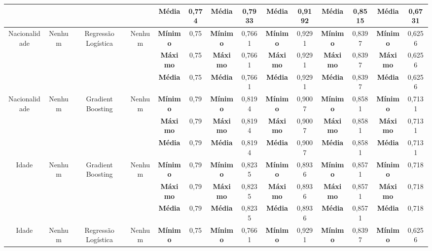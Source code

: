 \documentclass[portugues]{ic-tese}
\begin{document}
\begin{table}[H]
\begin{center}
{\begin{tabular}{c|c|c|c|c|c|c|c|c|c|c|c|c|c}
             & & & & \textbf{Média} & 0,774 & \textbf{Média} & 0,7933 & \textbf{Média} & 0,9192 & \textbf{Média} & 0,8515 & \textbf{Média} & 0,6731 \\
            \hline
            \multirow{3}{*}{Nacionalidade} & \multirow{3}{*}{Nenhum} & \multirow{3}{*}{Regressão Logística} & \multirow{3}{*}{Nenhum} & \textbf{Mínimo} & 0,75 & \textbf{Mínimo} & 0,7661 & \textbf{Mínimo} & 0,9291 & \textbf{Mínimo} & 0,8397 & \textbf{Mínimo} & 0,6256 \\
             & & & & \textbf{Máximo} & 0,75 & \textbf{Máximo} & 0,7661 & \textbf{Máximo} & 0,9291 & \textbf{Máximo} & 0,8397 & \textbf{Máximo} & 0,6256 \\
             & & & & \textbf{Média} & 0,75 & \textbf{Média} & 0,7661 & \textbf{Média} & 0,9291 & \textbf{Média} & 0,8397 & \textbf{Média} & 0,6256 \\
            \hline
            \multirow{3}{*}{Nacionalidade} & \multirow{3}{*}{Nenhum} & \multirow{3}{*}{Gradient Boosting} & \multirow{3}{*}{Nenhum} & \textbf{Mínimo} & 0,79 & \textbf{Mínimo} & 0,8194 & \textbf{Mínimo} & 0,9007 & \textbf{Mínimo} & 0,8581 & \textbf{Mínimo} & 0,7131 \\
             & & & & \textbf{Máximo} & 0,79 & \textbf{Máximo} & 0,8194 & \textbf{Máximo} & 0,9007 & \textbf{Máximo} & 0,8581 & \textbf{Máximo} & 0,7131 \\
             & & & & \textbf{Média} & 0,79 & \textbf{Média} & 0,8194 & \textbf{Média} & 0,9007 & \textbf{Média} & 0,8581 & \textbf{Média} & 0,7131 \\
            \hline
            \multirow{3}{*}{Idade} & \multirow{3}{*}{Nenhum} & \multirow{3}{*}{Gradient Boosting} & \multirow{3}{*}{Nenhum} & \textbf{Mínimo} & 0,79 & \textbf{Mínimo} & 0,8235 & \textbf{Mínimo} & 0,8936 & \textbf{Mínimo} & 0,8571 & \textbf{Mínimo} & 0,718 \\
             & & & & \textbf{Máximo} & 0,79 & \textbf{Máximo} & 0,8235 & \textbf{Máximo} & 0,8936 & \textbf{Máximo} & 0,8571 & \textbf{Máximo} & 0,718 \\
             & & & & \textbf{Média} & 0,79 & \textbf{Média} & 0,8235 & \textbf{Média} & 0,8936 & \textbf{Média} & 0,8571 & \textbf{Média} & 0,718 \\
            \hline
            \multirow{3}{*}{Idade} & \multirow{3}{*}{Nenhum} & \multirow{3}{*}{Regressão Logística} & \multirow{3}{*}{Nenhum} & \textbf{Mínimo} & 0,75 & \textbf{Mínimo} & 0,7661 & \textbf{Mínimo} & 0,9291 & \textbf{Mínimo} & 0,8397 & \textbf{Mínimo} & 0,6256 \\

\end{tabular}}
\end{center}
\end{table}
\end{document}
